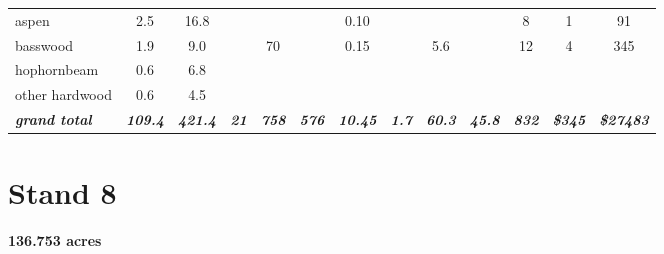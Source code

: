 \documentclass[landscape]{article}
\begin{document}
\begin{table}[H]
\begin{tabular}[t]{lcccccccccccc}
aspen & 2.5 & 16.8 &  &  &  & 0.10 &  &  &  & 8 & 1 & 91\\
 
\rowcolor{gray!6}  basswood & 1.9 & 9.0 &  & 70 &  & 0.15 &  & 5.6 &  & 12 & 4 & 345\\
 
hophornbeam & 0.6 & 6.8 &  &  &  &  &  &  &  &  &  & \\
 
\rowcolor{gray!6}  other hardwood & 0.6 & 4.5 &  &  &  &  &  &  &  &  &  & \\
 
\rowcolor[HTML]{DCDCDC}  \em{\textbf{grand total}} & \em{\textbf{109.4}} & \em{\textbf{421.4}} & \em{\textbf{21}} & \em{\textbf{758}} & \em{\textbf{576}} & \em{\textbf{10.45}} & \em{\textbf{1.7}} & \em{\textbf{60.3}} & \em{\textbf{45.8}} & \em{\textbf{832}} & \em{\textbf{\$345}} & \em{\textbf{\$27483}}\\
\bottomrule
\end{tabular}
\end{table}

\pagebreak

\section{Stand 8}\label{stand-8}

\textbf{136.753 acres}
\end{document}

